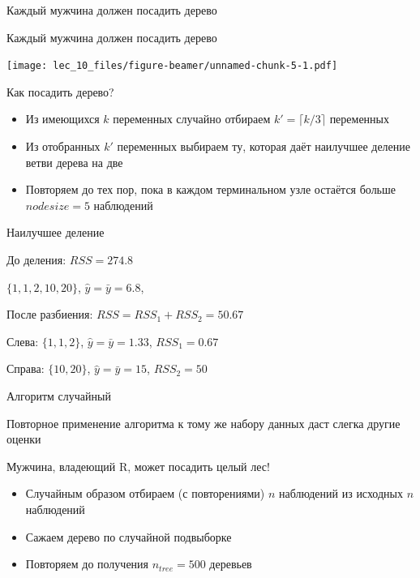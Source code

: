 \documentclass[ignorenonframetext,]{beamer}
\newcommand{\hy}{\hat{y}}
\begin{document}
\begin{frame}{Каждый мужчина должен посадить дерево}
\end{frame}

\begin{frame}{Каждый мужчина должен посадить дерево}

\texttt{[image: lec\_10\_files/figure-beamer/unnamed-chunk-5-1.pdf]}

\end{frame}

\begin{frame}{Как посадить дерево?}

\begin{itemize}
\item
  Из имеющихся \(k\) переменных случайно отбираем
  \(k'=\lceil k/3 \rceil\) переменных
\item
  Из отобранных \(k'\) переменных выбираем ту, которая даёт наилучшее
  деление ветви дерева на две
\item
  Повторяем до тех пор, пока в каждом терминальном узле остаётся больше
  \(nodesize=5\) наблюдений
\end{itemize}

\end{frame}

\begin{frame}{Наилучшее деление}

До деления: \(RSS=274.8\)

\(\{ 1, 1, 2, 10, 20\}\), \(\hy=\bar{y}=6.8\),

После разбиения: \(RSS=RSS_1+RSS_2=50.67\)

Слева: \(\{ 1, 1, 2 \}\), \(\hy=\bar{y}=1.33\), \(RSS_1=0.67\)

Справа: \(\{10,20\}\), \(\hy=\bar{y}=15\), \(RSS_2=50\)

\end{frame}

\begin{frame}{Алгоритм случайный}

Повторное применение алгоритма к тому же набору данных даст слегка
другие оценки

\end{frame}

\begin{frame}{Мужчина, владеющий R, может посадить целый лес!}

\begin{itemize}
\item
  Случайным образом отбираем (с повторениями) \(n\) наблюдений из
  исходных \(n\) наблюдений
\item
  Сажаем дерево по случайной подвыборке
\item
  Повторяем до получения \(n_{tree}=500\) деревьев
\end{itemize}

\end{frame}
\end{document}
